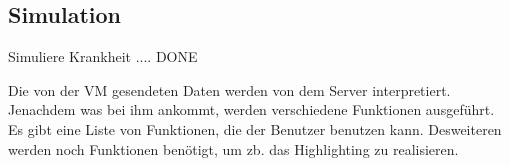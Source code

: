 \subsection{Simulation}

\begin{frame}
Simuliere Krankheit .... DONE
\end{frame}

\begin{frame}
Die von der VM gesendeten Daten werden von dem Server interpretiert. Jenachdem was bei ihm ankommt, werden verschiedene Funktionen ausgeführt. Es gibt eine Liste von Funktionen, die der Benutzer benutzen kann. Desweiteren werden noch Funktionen benötigt, um zb. das Highlighting zu realisieren.
\end{frame}